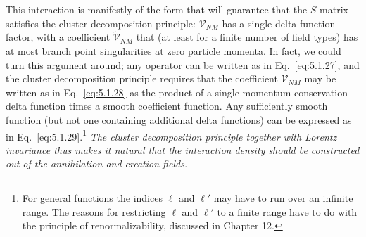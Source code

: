 This interaction is manifestly of the form that will guarantee that the
$S$-matrix satisfies the cluster decomposition principle: $\mathcal{V}_{NM}$
has a single delta function factor, with a coefficient
$\widetilde{\mathcal{V}}_{NM}$ that (at least for a finite number of field types)
has at most branch point singularities at zero particle momenta. In fact, we
could turn this argument around; any operator can be written as in Eq.~\eqref{eq:5.1.27},
and the cluster decomposition principle requires that the coefficient
$\mathcal{V}_{NM}$ may be written as in Eq.~\eqref{eq:5.1.28} as the product of a single
momentum-conservation delta function times a smooth coefficient function.
Any sufficiently smooth function (but not one containing additional delta
functions) can be expressed as in Eq.~\eqref{eq:5.1.29}.\footnote{For general functions
the indices $\ell$ and $\ell'$ may have to run over an infinite range. The
reasons for restricting $\ell$ and $\ell'$ to a finite range have to do with
the principle of renormalizability, discussed in Chapter 12.}
\textit{The cluster decomposition principle together with Lorentz invariance
thus makes it natural that the interaction density should be constructed out
of the annihilation and creation fields.}

